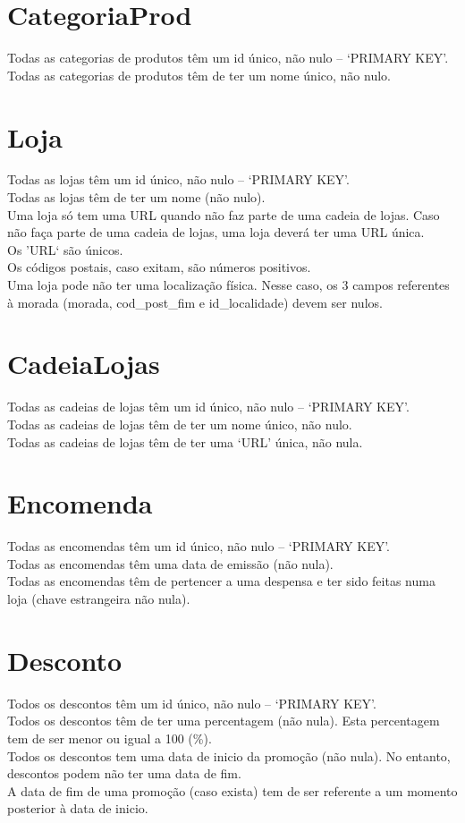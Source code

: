 \documentclass{report}
\begin{document}
\section{CategoriaProd}
Todas as categorias de produtos têm um id único, não nulo -- `PRIMARY KEY'.\\
Todas as categorias de produtos têm de ter um nome único, não nulo.
\section{Loja}
Todas as lojas têm um id único, não nulo -- `PRIMARY KEY'.\\
Todas as lojas têm de ter um nome (não nulo).\\
Uma loja só tem uma URL quando não faz parte de uma cadeia de lojas. Caso não
faça parte de uma cadeia de lojas, uma loja deverá ter uma URL única.\\
Os 'URL` são únicos.\\
Os códigos postais, caso exitam, são números positivos.\\
Uma loja pode não ter uma localização física. Nesse caso, os 3 campos referentes
à morada (morada, cod\_post\_fim e id\_localidade) devem ser nulos.\\
\section{CadeiaLojas}
Todas as cadeias de lojas têm um id único, não nulo -- `PRIMARY KEY'.\\
Todas as cadeias de lojas têm de ter um nome único, não nulo.\\
Todas as cadeias de lojas têm de ter uma `URL' única, não nula.
\section{Encomenda}
Todas as encomendas têm um id único, não nulo -- `PRIMARY KEY'.\\
Todas as encomendas têm uma data de emissão (não nula).\\
Todas as encomendas têm de pertencer a uma despensa e ter sido feitas numa
loja (chave estrangeira não nula).
\section{Desconto}
Todos os descontos têm um id único, não nulo -- `PRIMARY KEY'.\\
Todos os descontos têm de ter uma percentagem (não nula). Esta percentagem
tem de ser menor ou igual a 100 (\%).\\
Todos os descontos tem uma data de inicio da promoção (não nula). No entanto,
descontos podem não ter uma data de fim.\\
A data de fim de uma promoção (caso exista) tem de ser referente a um momento
posterior à data de inicio.
\end{document}
